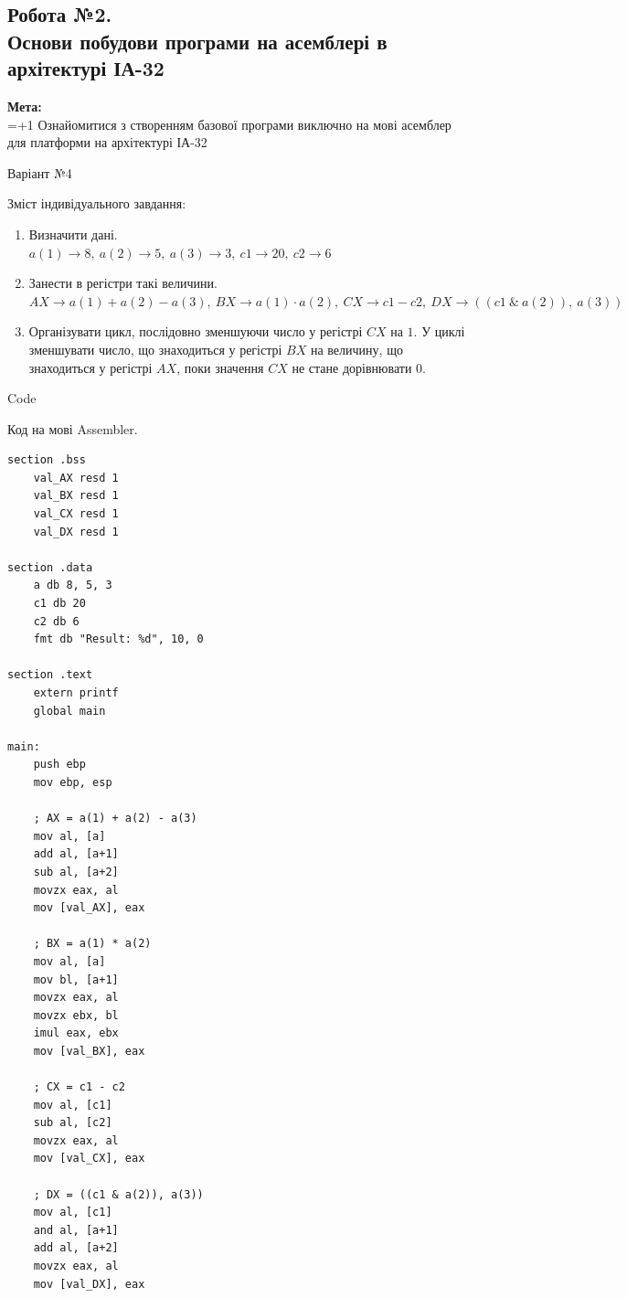 \documentclass[a4paper,12pt]{article}
\begin{document}
\newpage
    \begin{center}
        \section*{\bfseries{Робота №2.\\
        Основи побудови програми на асемблері в архітектурі ІА-32
    }}
    \end{center}
    \textbf{Мета:} \\
    \hangindent=1.5cm 
    \hangafter=+1 \noindent
    Ознайомитися з створенням базової програми виключно на мові асемблер для платформи на архітектурі ІА-32 \\
    \begin{center}
        \Large{Варіант №4}
    \end{center}
    Зміст індивідуального завдання:
    \begin{enumerate}
        \item Визначити дані. \\
        $
        a(1)\rightarrow 8,\: 
        a(2)\rightarrow 5,\:
        a(3)\rightarrow 3,\:
        c1  \rightarrow 20,\:
        c2  \rightarrow 6$
        \item Занести в регістри такі величини. \\
        $
        AX\rightarrow a(1)+a(2)-a(3),\:
        BX\rightarrow a(1)\cdot a(2),\:
        CX\rightarrow c1-c2,\:
        DX\rightarrow ((c1\: \&\: a(2)),\: a(3))$
        \item Організувати цикл, послідовно зменшуючи число у регістрі $CX$ на $1$. У
        циклі зменшувати число, що знаходиться у регістрі $BX$ на величину, що
        знаходиться у регістрі $AX$, поки значення $CX$ не стане дорівнювати $0$.
    \end{enumerate}

\newpage
    \begin{center}
        \Large{Code}
    \end{center}
    Код на мові Assembler.
    \begin{lstlisting}[language=assembler]
section .bss
    val_AX resd 1
    val_BX resd 1
    val_CX resd 1
    val_DX resd 1

section .data
    a db 8, 5, 3
    c1 db 20
    c2 db 6
    fmt db "Result: %d", 10, 0

section .text
    extern printf
    global main

main:
    push ebp
    mov ebp, esp

    ; AX = a(1) + a(2) - a(3)
    mov al, [a]
    add al, [a+1]
    sub al, [a+2]
    movzx eax, al
    mov [val_AX], eax
    
    ; BX = a(1) * a(2)
    mov al, [a]
    mov bl, [a+1]
    movzx eax, al
    movzx ebx, bl
    imul eax, ebx
    mov [val_BX], eax

    ; CX = c1 - c2
    mov al, [c1]
    sub al, [c2]
    movzx eax, al
    mov [val_CX], eax
    
    ; DX = ((c1 & a(2)), a(3))
    mov al, [c1]
    and al, [a+1]
    add al, [a+2]
    movzx eax, al
    mov [val_DX], eax
    \end{lstlisting}
\end{document}
